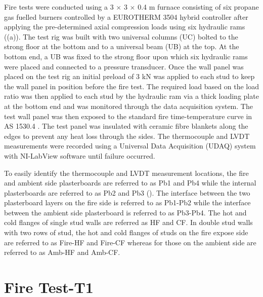 Fire tests were conducted using a 3 \(\times\) 3 \(\times\) 0.4 m furnace consisting of six propane gas fuelled burners controlled by a EUROTHERM 3504 hybrid controller after applying the pre-determined axial compression loads using six hydraulic rams ((a)). The test rig was built with two universal columns (UC) bolted to the strong floor at the bottom and to a universal beam (UB) at the top. At the bottom end, a UB was fixed to the strong floor upon which six hydraulic rams were placed and connected to a pressure transducer. Once the wall panel was placed on the test rig an initial preload of 3 kN was applied to each stud to keep the wall panel in position before the fire test. The required load based on the load ratio was then applied to each stud by the hydraulic ram via a thick loading plate at the bottom end and was monitored through the data acquisition system. The test wall panel was then exposed to the standard fire time-temperature curve in AS 1530.4 \citet{StandardsAustral2014}. The test panel was insulated with ceramic fibre blankets along the edges to prevent any heat loss through the sides. The thermocouple and LVDT measurements were recorded using a Universal Data Acquisition (UDAQ) system with NI-LabView software until failure occurred. 

To easily identify the thermocouple and LVDT measurement locations, the fire and ambient side plasterboards are referred to as Pb1 and Pb4 while the internal plasterboards are referred to as Pb2 and Pb3 (). The interface between the two plasterboard layers on the fire side is referred to as Pb1-Pb2 while the interface between the ambient side plasterboard is referred to as Pb3-Pb4. The hot and cold flanges of single stud walls are referred as HF and CF. In double stud walls with two rows of stud, the hot and cold flanges of studs on the fire expose side are referred to as Fire-HF and Fire-CF whereas for those on the ambient side are referred to as Amb-HF and Amb-CF.

\section{Fire Test-T1}

